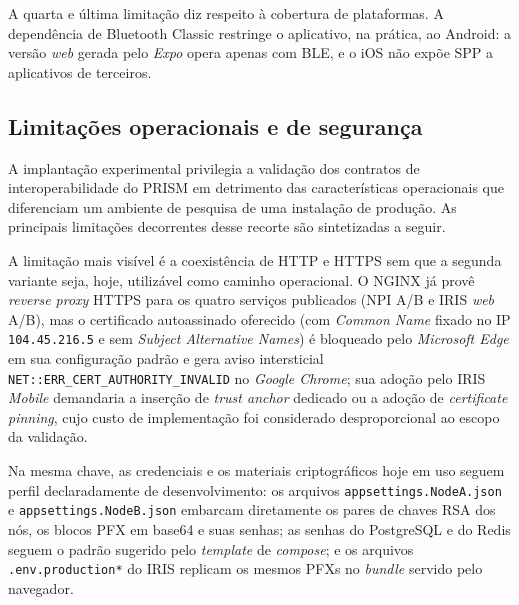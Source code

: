 A quarta e última limitação diz respeito à cobertura de  plataformas. A dependência de Bluetooth Classic restringe o aplicativo, na prática, ao Android: a versão \textit{web} gerada pelo \textit{Expo} opera apenas com BLE, e o iOS não expõe SPP a aplicativos de terceiros. 

\subsection{Limitações operacionais e de segurança}\label{subsec:limitacoesOperacionais}


A implantação experimental privilegia a validação dos contratos de interoperabilidade do PRISM em detrimento das características operacionais que diferenciam um ambiente de pesquisa de uma instalação de produção. As principais limitações decorrentes desse recorte são sintetizadas a seguir.

A limitação mais visível é a coexistência de HTTP e HTTPS sem que a segunda variante seja, hoje, utilizável como caminho operacional. O NGINX já provê \textit{reverse proxy} HTTPS para os quatro serviços publicados (NPI A/B e IRIS \textit{web} A/B), mas o certificado autoassinado oferecido (com \textit{Common Name} fixado no IP \texttt{104.45.216.5} e sem \textit{Subject Alternative Names}) é bloqueado pelo \textit{Microsoft Edge} em sua configuração padrão e gera aviso intersticial \texttt{NET::ERR\_CERT\_AUTHORITY\_INVALID} no \textit{Google Chrome}; sua adoção pelo IRIS \textit{Mobile} demandaria a inserção de \textit{trust anchor} dedicado ou a adoção de \textit{certificate pinning}, cujo custo de implementação foi considerado desproporcional ao escopo da validação. 

Na mesma chave, as credenciais e os materiais criptográficos hoje em uso seguem perfil declaradamente de desenvolvimento: os arquivos \texttt{appsettings.NodeA.json} e \texttt{appsettings.NodeB.json} embarcam diretamente os pares de chaves RSA dos nós, os blocos PFX em base64 e suas senhas; as senhas do PostgreSQL e do Redis seguem o padrão sugerido pelo \textit{template} de \textit{compose}; e os arquivos \texttt{.env.production*} do IRIS replicam os mesmos PFXs no \textit{bundle} servido pelo navegador. 

